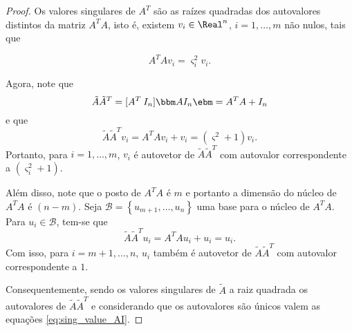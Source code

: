 \begin{proof}
Os valores singulares de $A^T$ são as raízes quadradas dos autovalores
distintos da matriz $A^TA$, isto é, existem $v_i\in \Real^n$, $i=1,\ldots,m$ não
nulos, tais que

\[
A^TAv_i = \varsigma^2_iv_i.
\]

Agora, note que
\[\tilde{A}\tilde{A}^T = [A^T \: I_n ]\bbm A\\ I_n \ebm = A^TA +
I_n
\]
e que
\[
\tilde{A}\tilde{A}^Tv_i = A^TAv_i + v_i = (\varsigma^2 + 1)v_i.
\]
Portanto, para $i=1,\ldots,m$,  $v_i$  é autovetor de
$\tilde{A}\tilde{A}^T$ com autovalor correspondente a $(\varsigma_i^2 + 1)$.

Além disso, note que o posto de $A^TA$ é $m$ e portanto
a dimensão do núcleo de $A^TA$ é $(n-m)$. Seja $\mathcal{B} =
\left\{ u_{m+1},\ldots,u_n\right\} $ uma base para o núcleo de $A^TA$. Para
$u_i\in\mathcal{B}$, tem-se que
\[
\tilde{A}\tilde{A}^Tu_i = A^TAu_i + u_i = u_i.
\]
Com isso, para $i=m+1,\ldots,n$,  $u_i$ também é autovetor de
$\tilde{A}\tilde{A}^T$ com autovalor correspondente a $1$.


Consequentemente, sendo os valores singulares de $\tilde{A}$ a raiz quadrada os
autovalores de $\tilde{A}\tilde{A}^T$  e considerando que os autovalores são
únicos valem as equações \eqref{eq:sing_value_AI}.
\end{proof}

